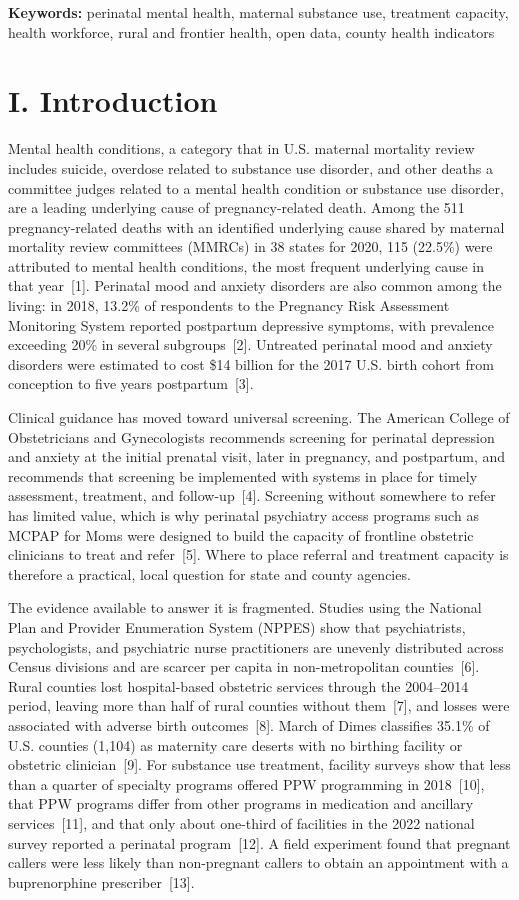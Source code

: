 \documentclass{article}
\begin{document}
\textbf{Keywords:} perinatal mental health, maternal substance use, treatment capacity, health workforce, rural and frontier health, open data, county health indicators

\section*{I. Introduction}

Mental health conditions, a category that in U.S. maternal mortality review includes suicide, overdose related to substance use disorder, and other deaths a committee judges related to a mental health condition or substance use disorder, are a leading underlying cause of pregnancy-related death. Among the 511 pregnancy-related deaths with an identified underlying cause shared by maternal mortality review committees (MMRCs) in 38 states for 2020, 115 (22.5\%) were attributed to mental health conditions, the most frequent underlying cause in that year~[1]. Perinatal mood and anxiety disorders are also common among the living: in 2018, 13.2\% of respondents to the Pregnancy Risk Assessment Monitoring System reported postpartum depressive symptoms, with prevalence exceeding 20\% in several subgroups~[2]. Untreated perinatal mood and anxiety disorders were estimated to cost \$14 billion for the 2017 U.S. birth cohort from conception to five years postpartum~[3].

Clinical guidance has moved toward universal screening. The American College of Obstetricians and Gynecologists recommends screening for perinatal depression and anxiety at the initial prenatal visit, later in pregnancy, and postpartum, and recommends that screening be implemented with systems in place for timely assessment, treatment, and follow-up~[4]. Screening without somewhere to refer has limited value, which is why perinatal psychiatry access programs such as MCPAP for Moms were designed to build the capacity of frontline obstetric clinicians to treat and refer~[5]. Where to place referral and treatment capacity is therefore a practical, local question for state and county agencies.

The evidence available to answer it is fragmented. Studies using the National Plan and Provider Enumeration System (NPPES) show that psychiatrists, psychologists, and psychiatric nurse practitioners are unevenly distributed across Census divisions and are scarcer per capita in non-metropolitan counties~[6]. Rural counties lost hospital-based obstetric services through the 2004--2014 period, leaving more than half of rural counties without them~[7], and losses were associated with adverse birth outcomes~[8]. March of Dimes classifies 35.1\% of U.S. counties (1,104) as maternity care deserts with no birthing facility or obstetric clinician~[9]. For substance use treatment, facility surveys show that less than a quarter of specialty programs offered PPW programming in 2018~[10], that PPW programs differ from other programs in medication and ancillary services~[11], and that only about one-third of facilities in the 2022 national survey reported a perinatal program~[12]. A field experiment found that pregnant callers were less likely than non-pregnant callers to obtain an appointment with a buprenorphine prescriber~[13].
\end{document}
